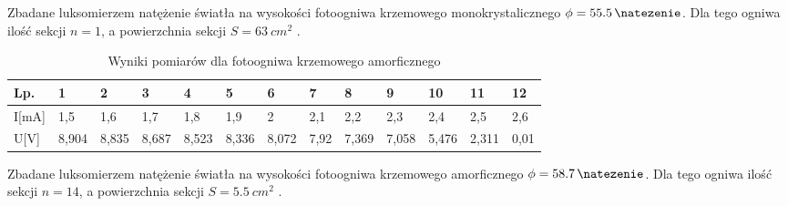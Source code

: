 \documentclass{article}
\begin{document}
Zbadane luksomierzem natężenie światła na wysokości fotoogniwa
krzemowego monokrystalicznego $\phi = \SI{55.5}{\natezenie}$.
Dla tego ogniwa ilość sekcji $n = 1$, a powierzchnia sekcji $S= \SI{63}{cm^2}$ .
\begin{table}[!ht]
    \centering
    \begin{tabular}{|l|l|l|l|l|l|l|l|l|l|l|l|l|}
    \hline
        Lp. & 1 & 2 & 3 & 4 & 5 & 6 & 7 & 8 & 9 & 10 & 11 & 12 \\ \hline
        I[mA] & 1,5 & 1,6 & 1,7 & 1,8 & 1,9 & 2 & 2,1 & 2,2 & 2,3 & 2,4 & 2,5 & 2,6 \\ \hline
        U[V] & 8,904 & 8,835 & 8,687 & 8,523 & 8,336 & 8,072 & 7,92 & 7,369 & 7,058 & 5,476 & 2,311 & 0,01 \\ \hline
    \end{tabular}
    \caption{Wyniki pomiarów dla fotoogniwa krzemowego amorficznego}
 \label{pom:3}
\end{table}

Zbadane luksomierzem natężenie światła na wysokości fotoogniwa
krzemowego amorficznego $\phi = \SI{58.7}{\natezenie}$.
Dla tego ogniwa ilość sekcji $n = 14$, a powierzchnia sekcji $S= \SI{5.5}{cm^2}$ .
\end{document}
